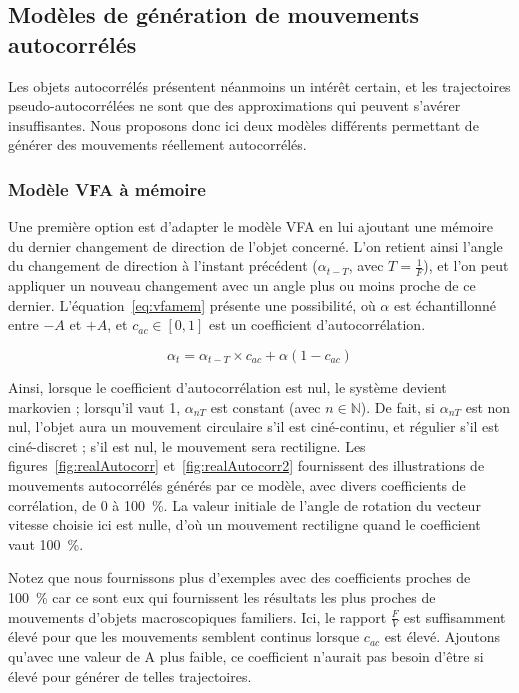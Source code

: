     \subsection{Modèles de génération de mouvements autocorrélés}
    \label{sub:vfaAutoCorr}
    Les objets autocorrélés présentent néanmoins un intérêt certain, et les trajectoires pseudo-autocorrélées ne sont que des approximations qui peuvent s'avérer insuffisantes. Nous proposons donc ici deux modèles différents permettant de générer des mouvements réellement autocorrélés.
    
    \subsubsection{Modèle VFA à mémoire}
    \label{sub:vfaMem}
    Une première option est d'adapter le modèle VFA en lui ajoutant une mémoire du dernier changement de direction de l'objet concerné. L'on retient ainsi l'angle du changement de direction à l'instant précédent ($\alpha_{t-T}$, avec $T = \frac{1}{F}$), et l'on peut appliquer un nouveau changement avec un angle plus ou moins proche de ce dernier. L'équation~\ref{eq:vfamem} présente une possibilité, où $\alpha$ est échantillonné entre $-A$ et $+A$, et $c_{ac} \in [0,1]$ est un coefficient d'autocorrélation.
    
    \begin{equation}
		\alpha_{t} = \alpha_{t-T} \times c_{ac} + \alpha (1 - c_{ac})
		\label{eq:vfamem}
    \end{equation}
    
	Ainsi, lorsque le coefficient d'autocorrélation est nul, le système devient markovien ; lorsqu'il vaut 1, $\alpha_{nT}$ est constant (avec $n \in \mathbb{N}$). De fait, si $\alpha_{nT}$ est non nul, l'objet aura un mouvement circulaire s'il est ciné-continu, et régulier s'il est ciné-discret ; s'il est nul, le mouvement sera rectiligne. Les figures~\ref{fig:realAutocorr} et~\ref{fig:realAutocorr2} fournissent des illustrations de mouvements autocorrélés générés par ce modèle, avec divers coefficients de corrélation, de 0 à 100~\%{}. La valeur initiale de l'angle de rotation du vecteur vitesse choisie ici est nulle, d'où un mouvement rectiligne quand le coefficient vaut 100~\%{}.
	
	Notez que nous fournissons plus d'exemples avec des coefficients proches de 100~\%{} car ce sont eux qui fournissent les résultats les plus proches de mouvements d'objets macroscopiques familiers. Ici, le rapport $\frac{F}{V}$ est suffisamment élevé pour que les mouvements semblent continus lorsque $c_{ac}$ est élevé. Ajoutons qu'avec une valeur de A plus faible, ce coefficient n'aurait pas besoin d'être si élevé pour générer de telles trajectoires.
    
